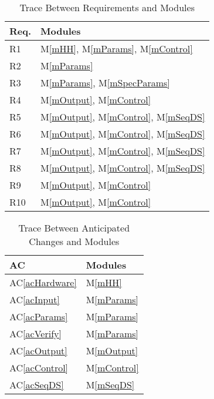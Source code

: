\documentclass[12pt]{article}
\newcommand{\acref}[1]{AC\ref{#1}}
\newcommand{\mref}[1]{M\ref{#1}}
\begin{document}
\begin{table}[H]
\centering
\begin{tabular}{p{} p{}}
\toprule
\textbf{Req.} & \textbf{Modules}\\
\midrule
R1 & \mref{mHH}, \mref{mParams}, \mref{mControl}\\ %
R2 & \mref{mParams}\\ %
R3 & \mref{mParams}, \mref{mSpecParams}\\ %
R4 & \mref{mOutput}, \mref{mControl}\\
R5 & \mref{mOutput}, \mref{mControl}, \mref{mSeqDS}\\ %
R6 & \mref{mOutput}, \mref{mControl}, \mref{mSeqDS}\\ %
R7 & \mref{mOutput}, \mref{mControl}, \mref{mSeqDS}\\ %
R8 & \mref{mOutput}, \mref{mControl}, \mref{mSeqDS}\\ %
R9 & \mref{mOutput}, \mref{mControl}\\
R10 & \mref{mOutput}, \mref{mControl}\\
\bottomrule
\end{tabular}
\caption{Trace Between Requirements and Modules}
\label{TblRT}
\end{table}

\begin{table}[H]
\centering
\begin{tabular}{p{} p{}}
\toprule
\textbf{AC} & \textbf{Modules}\\
\midrule
\acref{acHardware} & \mref{mHH}\\
\acref{acInput} & \mref{mParams}\\ %
\acref{acParams} & \mref{mParams}\\
\acref{acVerify} & \mref{mParams}\\ %
\acref{acOutput} & \mref{mOutput}\\
\acref{acControl} & \mref{mControl}\\
\acref{acSeqDS} & \mref{mSeqDS}\\
\bottomrule
\end{tabular}
\caption{Trace Between Anticipated Changes and Modules}
\label{TblACT}
\end{table}
\end{document}
